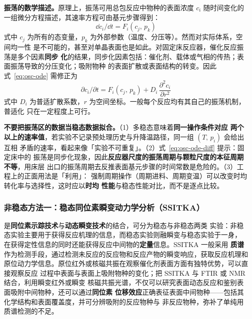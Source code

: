 \begin{principle}
\textbf{振荡的数学描述。}原理上，振荡可用总包反应中物种的表面浓度 $c_i$ 随时间变化的
一组微分方程描述，其速率方程可由基元步骤得到：
\begin{equation}
\dd c_i/\dd t=F_i(c_j,\,p_k)
\label{eq:osc-ode}
\end{equation}
式中 $c_j$ 为所有的态变量，$p_k$ 为外部参数（温度、分压等）。然而对实际体系，空间均一性
是不可能的，甚至对单晶表面也是如此。对固定床反应器，催化反应振荡是多个因素\textbf{同步
化}的结果，同步化因素包括：催化剂、载体或气相的传热；表面振荡导致的分压变化；吸附物种
的表面扩散或表面结构的转变。因此式~\eqref{eq:osc-ode} 需修正为
\begin{equation}
\partial c_i/\partial t=F_i(c_j,\,p_k)+D_i\,\frac{\partial^{2}c_i}{\partial r^{2}}
\label{eq:osc-ode-diff}
\end{equation}
式中 $D_i$ 为普适扩散系数，$r$ 为空间坐标。一般每个反应均有其自己的振荡机制，普适化
只在一定程度上可行。
\end{principle}

\begin{pitfall}
\textbf{不要把振荡区的数据当稳态数据拟合。}（1）多稳态意味着\textbf{同一操作条件对应
两个以上的速率值}，若实验不记录预处理历史与升降温路径，同一组 $(T,\,p_i)$ 会给出互相
矛盾的速率，看起来像「实验不可重复」。（2）式~\eqref{eq:osc-ode-diff} 提示：固定床中的
振荡是同步化现象，因此\textbf{反应器尺度的振荡周期与颗粒尺度的本征周期不等}，用床层
出口的振荡周期去反推表面基元步骤的时间常数是危险的。（3）工程上的正面用法是「利用」：
强制周期操作（周期进料、周期变温）可以改变时均转化率与选择性，这时应以\textbf{时均
性能}与稳态性能对比，而不是逐点比较。
\end{pitfall}

\subsubsection{非稳态方法一：稳态同位素瞬变动力学分析（SSITKA）}

是\textbf{同位素示踪技术}与\textbf{动态瞬变技术}的结合，可分为稳态与非稳态两类
实验：非稳态实验主要用于获得反应机理的信息，而稳态实验则融瞬变与稳态实验于一身，
在获得定性信息的同时还能获得反应中间物的\textbf{定量}信息。SSITKA 一般采用
\textbf{质谱}作为检测手段，通过检测未反应的反应物和反应产物的瞬变响应，获取反应机理和
原位动力学信息。原位红外或核磁共振在观察催化剂表面方面有独特优势，可以直接观察反应
过程中表面与表面上吸附物种的变化；把 SSITKA 与 FTIR 或 NMR 结合，利用瞬变红外或瞬变
核磁共振光谱，不仅可以研究表面动态反应和鉴别表面吸附中间物种，还可以通过\textbf{同位素
位移效应}正确表征表面中间物种——包括其化学结构和表面覆盖度，并可分辨吸附的反应物种与
非反应物种，弥补了单纯用质谱检测的不足。

